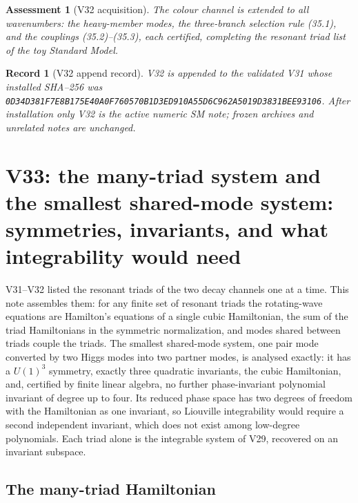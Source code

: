 \documentclass[11pt]{article}
\newtheorem{assessment}[theorem]{Assessment}
\newtheorem{record}[theorem]{Record}
\theoremstyle{remark}
\begin{document}
\begin{assessment}[V32 acquisition]
\label{ass:v20v32}
The colour channel is extended to all wavenumbers: the heavy-member
modes, the three-branch selection rule (35.1), and the couplings
(35.2)--(35.3), each certified, completing the resonant triad list
of the toy Standard Model.
\end{assessment}

\begin{record}[V32 append record]
\label{rec:v20v32}
V32 is appended to the validated V31 whose installed SHA--256 was
\texttt{0D34D381F7E8B175E40A0F760570B1D3ED910A55D6C962A5019D3831BEE93106}.
After installation only V32 is the active numeric SM note; frozen
archives and unrelated notes are unchanged.
\end{record}


\section{V33: the many-triad system and the smallest shared-mode system: symmetries, invariants, and what integrability would need}
\label{sec:v20v33}

V31--V32 listed the resonant triads of the two decay channels one at
a time.  This note assembles them: for any finite set of resonant
triads the rotating-wave equations are Hamilton's equations of a
single cubic Hamiltonian, the sum of the triad Hamiltonians in the
symmetric normalization, and modes shared between triads couple the
triads.  The smallest shared-mode system, one pair mode converted by
two Higgs modes into two partner modes, is analysed exactly: it has
a \(U(1)^3\) symmetry, exactly three quadratic invariants, the cubic
Hamiltonian, and, certified by finite linear algebra, no further
phase-invariant polynomial invariant of degree up to four.  Its
reduced phase space has two degrees of freedom with the Hamiltonian
as one invariant, so Liouville integrability would require a second
independent invariant, which does not exist among low-degree
polynomials.  Each triad alone is the integrable system of V29,
recovered on an invariant subspace.

\subsection{The many-triad Hamiltonian}
\end{document}
